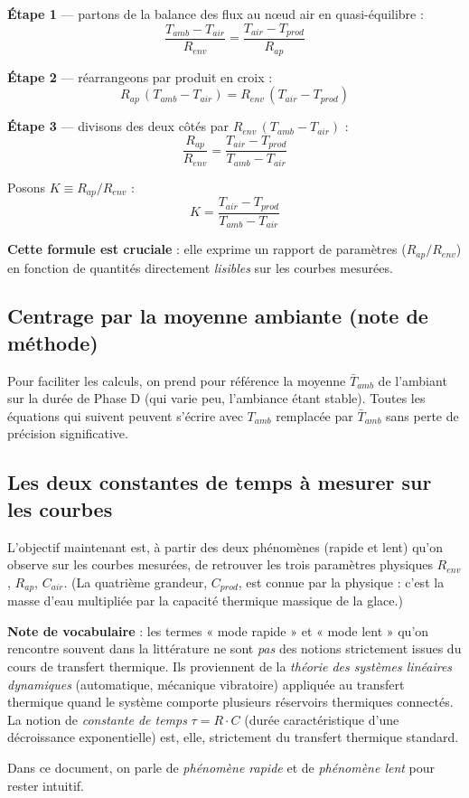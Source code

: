 \documentclass[11pt,a4paper]{article}
\begin{document}
\begin{demo}
\textbf{Étape 1} — partons de la balance des flux au nœud air en quasi-équilibre :
$$\frac{T_{amb} - T_{air}}{R_{env}} = \frac{T_{air} - T_{prod}}{R_{ap}}$$

\textbf{Étape 2} — réarrangeons par produit en croix :
$$R_{ap}\,(T_{amb} - T_{air}) = R_{env}\,(T_{air} - T_{prod})$$

\textbf{Étape 3} — divisons des deux côtés par $R_{env}\,(T_{amb} - T_{air})$ :
$$\frac{R_{ap}}{R_{env}} = \frac{T_{air} - T_{prod}}{T_{amb} - T_{air}}$$

Posons $K \equiv R_{ap}/R_{env}$ :
\begin{equation}
\boxed{\;K = \frac{T_{air} - T_{prod}}{T_{amb} - T_{air}}\;}
\label{eq:K}
\end{equation}

\textbf{Cette formule est cruciale} : elle exprime un rapport de paramètres ($R_{ap}/R_{env}$)
en fonction de quantités directement \emph{lisibles} sur les courbes mesurées.
\end{demo}

\subsection{Centrage par la moyenne ambiante (note de méthode)}

Pour faciliter les calculs, on prend pour référence la moyenne $\bar T_{amb}$ de l'ambiant
sur la durée de Phase D (qui varie peu, l'ambiance étant stable). Toutes les équations qui
suivent peuvent s'écrire avec $T_{amb}$ remplacée par $\bar T_{amb}$ sans perte de précision
significative.

\subsection{Les deux constantes de temps à mesurer sur les courbes}

L'objectif maintenant est, à partir des deux phénomènes (rapide et lent) qu'on observe sur
les courbes mesurées, de retrouver les trois paramètres physiques $R_{env}$, $R_{ap}$,
$C_{air}$. (La quatrième grandeur, $C_{prod}$, est connue par la physique : c'est la masse
d'eau multipliée par la capacité thermique massique de la glace.)

\begin{honnete}
\textbf{Note de vocabulaire} : les termes « mode rapide » et « mode lent » qu'on rencontre
souvent dans la littérature ne sont \emph{pas} des notions strictement issues du cours de
transfert thermique. Ils proviennent de la \emph{théorie des systèmes linéaires dynamiques}
(automatique, mécanique vibratoire) appliquée au transfert thermique quand le système
comporte plusieurs réservoirs thermiques connectés. La notion de \emph{constante de temps}
$\tau = R \cdot C$ (durée caractéristique d'une décroissance exponentielle) est, elle,
strictement du transfert thermique standard.

Dans ce document, on parle de \emph{phénomène rapide} et de \emph{phénomène lent} pour
rester intuitif.
\end{honnete}
\end{document}

